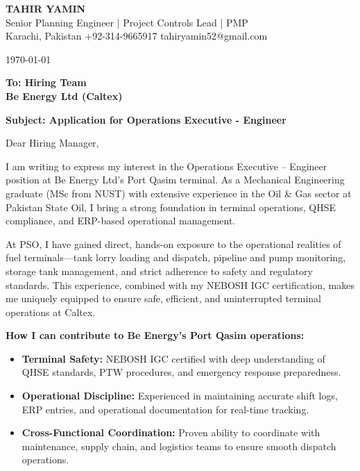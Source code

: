 \documentclass[11pt,a4paper]{article}
\begin{document}
\begin{center}
    {\Huge \textbf{\color{awesome-darknight} TAHIR YAMIN}} \\[0.2cm]
    {\Large \color{awesome-gray} Senior Planning Engineer | Project Controls Lead | PMP} \\[0.3cm]
    
    \small \color{light-gray}
    Karachi, Pakistan \quad \textbullet \quad 
    +92-314-9665917 \quad \textbullet \quad 
    tahiryamin52@gmail.com
\end{center}

\vspace{0.8cm}
\today
\vspace{0.5cm}

\textbf{To: Hiring Team} \\
\textbf{Be Energy Ltd (Caltex)} \\
\vspace{0.5cm}

\textbf{Subject: Application for Operations Executive - Engineer}

\vspace{0.5cm}

Dear Hiring Manager,

I am writing to express my interest in the Operations Executive -- Engineer position at Be Energy Ltd's Port Qasim terminal. As a Mechanical Engineering graduate (MSc from NUST) with extensive experience in the Oil \& Gas sector at Pakistan State Oil, I bring a strong foundation in terminal operations, QHSE compliance, and ERP-based operational management.

At PSO, I have gained direct, hands-on exposure to the operational realities of fuel terminals---tank lorry loading and dispatch, pipeline and pump monitoring, storage tank management, and strict adherence to safety and regulatory standards. This experience, combined with my NEBOSH IGC certification, makes me uniquely equipped to ensure safe, efficient, and uninterrupted terminal operations at Caltex.

\textbf{How I can contribute to Be Energy's Port Qasim operations:}
\begin{itemize}
    \item \textbf{Terminal Safety:} NEBOSH IGC certified with deep understanding of QHSE standards, PTW procedures, and emergency response preparedness.
    \item \textbf{Operational Discipline:} Experienced in maintaining accurate shift logs, ERP entries, and operational documentation for real-time tracking.
    \item \textbf{Cross-Functional Coordination:} Proven ability to coordinate with maintenance, supply chain, and logistics teams to ensure smooth dispatch operations.
\end{itemize}
\end{document}
